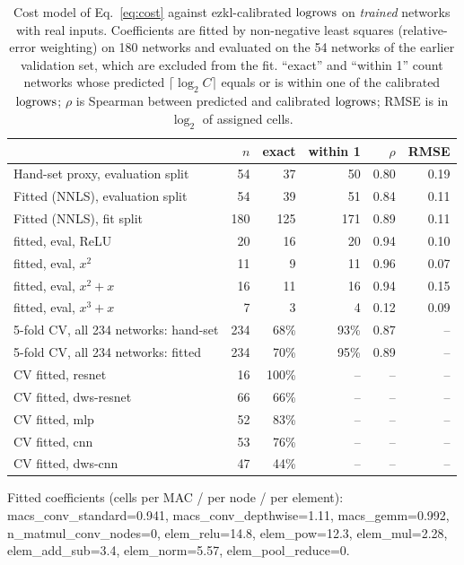 \begin{table}[h]
\centering
\caption{Cost model of Eq.~\eqref{eq:cost} against ezkl-calibrated $\mathrm{logrows}$ on \emph{trained} networks with real inputs.
  Coefficients are fitted by non-negative least squares (relative-error weighting) on 180 networks and evaluated on the
  54 networks of the earlier validation set, which are excluded from the fit.  ``exact'' and ``within 1'' count
  networks whose predicted $\lceil\log_2 C\rceil$ equals or is within one of the calibrated $\mathrm{logrows}$; $\rho$ is Spearman between predicted and
  calibrated $\mathrm{logrows}$; RMSE is in $\log_2$ of assigned cells.}
\label{tab:costfit}
\small
\begin{tabular}{lrrrrr}
\toprule
 & $n$ & \textbf{exact} & \textbf{within 1} & $\rho$ & \textbf{RMSE} \\
\midrule
Hand-set proxy, evaluation split & 54 & 37 & 50 & 0.80 & 0.19 \\
Fitted (NNLS), evaluation split & 54 & 39 & 51 & 0.84 & 0.11 \\
Fitted (NNLS), fit split & 180 & 125 & 171 & 0.89 & 0.11 \\
\quad fitted, eval, ReLU & 20 & 16 & 20 & 0.94 & 0.10 \\
\quad fitted, eval, $x^2$ & 11 & 9 & 11 & 0.96 & 0.07 \\
\quad fitted, eval, $x^2{+}x$ & 16 & 11 & 16 & 0.94 & 0.15 \\
\quad fitted, eval, $x^3{+}x$ & 7 & 3 & 4 & 0.12 & 0.09 \\
5-fold CV, all 234 networks: hand-set & 234 & 68\% & 93\% & 0.87 & -- \\
5-fold CV, all 234 networks: fitted & 234 & 70\% & 95\% & 0.89 & -- \\
\quad CV fitted, resnet & 16 & 100\% & -- & -- & -- \\
\quad CV fitted, dws-resnet & 66 & 66\% & -- & -- & -- \\
\quad CV fitted, mlp & 52 & 83\% & -- & -- & -- \\
\quad CV fitted, cnn & 53 & 76\% & -- & -- & -- \\
\quad CV fitted, dws-cnn & 47 & 44\% & -- & -- & -- \\
\bottomrule
\end{tabular}

\smallskip
{\scriptsize Fitted coefficients (cells per MAC / per node / per element): macs\_conv\_standard=0.941, macs\_conv\_depthwise=1.11, macs\_gemm=0.992, n\_matmul\_conv\_nodes=0, elem\_relu=14.8, elem\_pow=12.3, elem\_mul=2.28, elem\_add\_sub=3.4, elem\_norm=5.57, elem\_pool\_reduce=0.}
\end{table}
